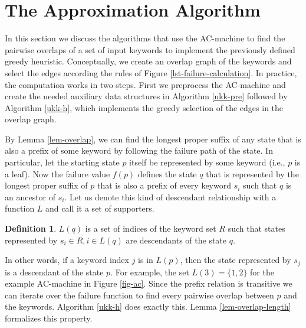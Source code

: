 \documentclass[english,twoside,censored,csm,algorithms-track-2020]{HYthesisML}
\theoremstyle{plain}
\theoremstyle{definition}
\newtheorem{definition}[theorem]{Definition}
\begin{document}

\section{The Approximation Algorithm}

In this section we discuss the algorithms that use the AC-machine to find the pairwise overlaps
of a set of input keywords to implement the previously defined greedy heuristic. Conceptually,
we create an overlap graph of the keywords and select the edges according the rules of
Figure \ref{lst-failure-calculation}. In practice, the computation works in two steps. First we
preprocess the AC-machine and create the needed auxiliary data structures in Algorithm \ref{ukk-pre}
followed by Algorithm \ref{ukk-h}, which implements the greedy selection of the edges in the
overlap graph.

By Lemma \ref{lem-overlap}, we can find the longest proper suffix of any state that is also
a prefix of some keyword by following the failure path of the state. In particular, let the starting
state $p$ itself be represented by some keyword (i.e., $p$ is a leaf). Now the failure value $f(p)$
defines the state $q$ that is represented by the longest proper suffix of $p$ that is also a prefix
of every keyword $s_i$ such that $q$ is an ancestor of $s_i$.
Let us denote this kind of descendant relationship with a function $L$ and call it a set of
supporters.

\begin{definition}
$L(q)$ is a set of indices of the keyword set $R$ such that states represented by
$s_i\in R, i\in L(q)$ are descendants of the state $q$.
\end{definition}

In other words, if a keyword index
$j$ is in $L(p)$, then the state represented by $s_j$ is a descendant of the state $p$.
For example, the set $L(3) = \{1,2\}$ for the example AC-machine in Figure \ref{fig-ac}.
Since the prefix relation is transitive we can iterate over the failure function to find every
pairwise overlap between $p$ and the keywords. Algorithm \ref{ukk-h} does exactly this.
Lemma \ref{lem-overlap-length} formalizes this property.


\end{document}
